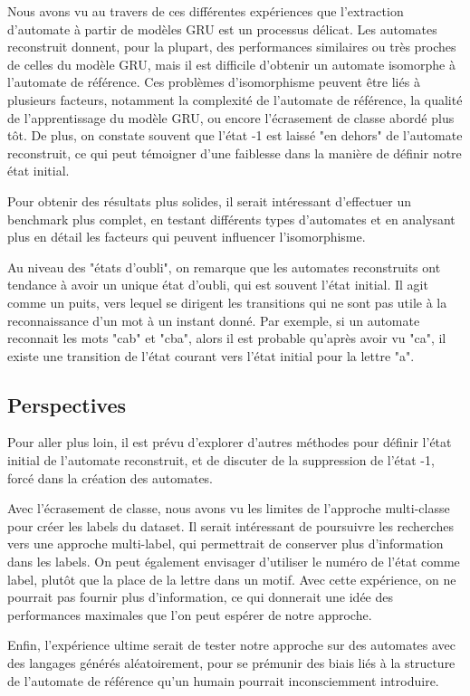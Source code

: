 \documentclass{article}
\begin{document}
\par Nous avons vu au travers de ces différentes expériences que l'extraction d'automate à partir de modèles GRU est un processus délicat. Les automates
reconstruit donnent, pour la plupart, des performances similaires ou très proches de celles du modèle GRU, mais il est difficile d'obtenir un 
automate isomorphe à l'automate de référence. Ces problèmes d'isomorphisme peuvent être liés à plusieurs facteurs, notamment la complexité 
de l'automate de référence, la qualité de l'apprentissage du modèle GRU, ou encore l'écrasement de classe abordé plus tôt. De plus, on constate 
souvent que l'état -1 est laissé "en dehors" de l'automate reconstruit, ce qui peut témoigner d'une faiblesse dans la manière de définir notre 
état initial.
\par Pour obtenir des résultats plus solides, il serait intéressant d'effectuer un benchmark plus complet, en testant différents types d'automates
et en analysant plus en détail les facteurs qui peuvent influencer l'isomorphisme.
\\
\par Au niveau des "états d'oubli", on remarque que les automates reconstruits ont tendance à avoir un unique état d'oubli, qui est souvent l'état initial.
Il agit comme un puits, vers lequel se dirigent les transitions qui ne sont pas utile à la reconnaissance d'un mot à un instant donné. Par exemple, 
si un automate reconnait les mots "cab" et "cba", alors il est probable qu'après avoir vu "ca", il existe une transition de l'état courant vers
l'état initial pour la lettre "a".


\subsection{Perspectives}
\par Pour aller plus loin, il est prévu d'explorer d'autres méthodes pour définir l'état initial de l'automate reconstruit, et de discuter de la 
suppression de l'état -1, forcé dans la création des automates.
\par Avec l'écrasement de classe, nous avons vu les limites de l'approche multi-classe pour créer les labels du dataset. Il serait intéressant 
de poursuivre les recherches vers une approche multi-label, qui permettrait de conserver plus d'information dans les labels. On peut également envisager
d'utiliser le numéro de l'état comme label, plutôt que la place de la lettre dans un motif. Avec cette expérience, on ne pourrait pas fournir plus 
d'information, ce qui donnerait une idée des performances maximales que l'on peut espérer de notre approche.
\par Enfin, l'expérience ultime serait de tester notre approche sur des automates avec des langages générés aléatoirement, pour se prémunir des
biais liés à la structure de l'automate de référence qu'un humain pourrait inconsciemment introduire.
\end{document}
